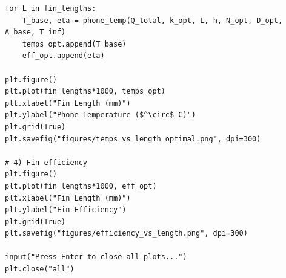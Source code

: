 \documentclass[12pt]{article}
\begin{document}
\begin{lstlisting}
for L in fin_lengths:
    T_base, eta = phone_temp(Q_total, k_opt, L, h, N_opt, D_opt, A_base, T_inf)
    temps_opt.append(T_base)
    eff_opt.append(eta)

plt.figure()
plt.plot(fin_lengths*1000, temps_opt)
plt.xlabel("Fin Length (mm)")
plt.ylabel("Phone Temperature ($^\circ$ C)")
plt.grid(True)
plt.savefig("figures/temps_vs_length_optimal.png", dpi=300)

# 4) Fin efficiency
plt.figure()
plt.plot(fin_lengths*1000, eff_opt)
plt.xlabel("Fin Length (mm)")
plt.ylabel("Fin Efficiency")
plt.grid(True)
plt.savefig("figures/efficiency_vs_length.png", dpi=300)

input("Press Enter to close all plots...")
plt.close("all")
\end{lstlisting}
\end{document}
